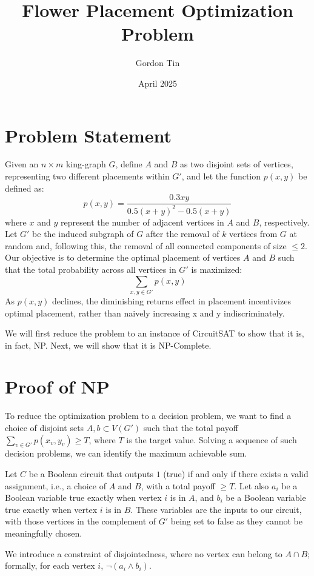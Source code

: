 \documentclass[11pt]{article}
\title{Flower Placement Optimization Problem}
\author{Gordon Tin}
\date{April 2025}
\theoremstyle{plain}
\theoremstyle{definition}
\theoremstyle{remark}
\begin{document}
\maketitle

\section{Problem Statement}

Given an $n \times m$ king-graph $G$, define $A$ and $B$ as two disjoint sets of vertices, representing two different placements within $G'$, and let the function $p(x,y)$ be defined as: 
\[p(x,y)= \frac{0.3xy}{0.5(x+y)^{2}-0.5(x+y)}\]
where $x$ and $y$ represent the number of adjacent vertices in $A$ and $B$, respectively. Let $G'$ be the induced subgraph of $G$ after the removal of $k$ vertices from $G$ at random and, following this, the removal of all connected components of size $\leq 2$.
Our objective is to determine the optimal placement of vertices $A$ and $B$ such that the total probability across all vertices in $G'$ is maximized: \[\sum_{x,y \in G'} p(x,y)\] 
As \(p(x,y)\) declines, the diminishing returns effect in placement incentivizes optimal placement, rather than naively increasing x and y indiscriminately.

We will first reduce the problem to an instance of CircuitSAT to show that it is, in fact, NP. Next, we will show that it is NP-Complete. 

\section{Proof of NP}

To reduce the optimization problem to a decision problem, we want to find a choice of disjoint sets $A, b \subset V(G')$ such that the total payoff $\sum_{v \in G'} p(x_v, y_v) \geq T$, where $T$ is the target value. Solving a sequence of such decision problems, we can identify the maximum achievable sum. 

Let $C$ be a Boolean circuit that outputs $1$ (true) if and only if there exists a valid assignment, i.e., a choice of $A$ and $B$, with a total payoff $\geq T$. Let also $a_i$ be a Boolean variable true exactly when vertex $i$ is in $A$, and $b_i$ be a Boolean variable true exactly when vertex $i$ is in $B$. These variables are the inputs to our circuit, with those vertices in the complement of $G'$ being set to false as they cannot be meaningfully chosen.

We introduce a constraint of disjointedness, where no vertex can belong to $A \cap B$; formally, for each vertex $i$, $\neg (a_i \land b_i)$.
\end{document}
